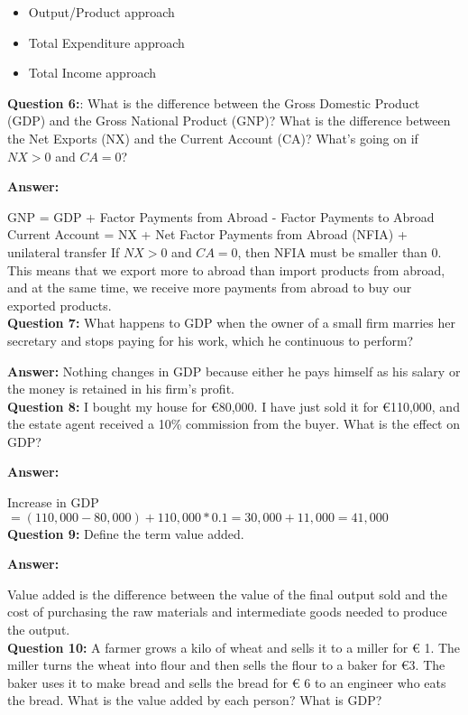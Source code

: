 \documentclass[a4paper, 11pt]{article}
\begin{document}
\begin{itemize}
\item Output/Product approach
\item Total Expenditure approach
\item Total Income approach
\end{itemize}  

\textbf{Question 6:}: What is the difference between the Gross Domestic Product (GDP) and the Gross National Product (GNP)? What is the difference between the Net Exports (NX) and the Current Account (CA)? What’s going on if $NX>0$ and $CA=0$?

\textbf{Answer:} 

GNP = GDP + Factor Payments from Abroad - Factor Payments to Abroad
Current Account = NX + Net Factor Payments from Abroad (NFIA) + unilateral transfer
If $NX>0$ and $CA=0$, then NFIA must be smaller than 0. This means that we export more to abroad than import products from abroad, and at the same time, we receive more payments from abroad to buy our exported products. \\

\textbf{Question 7:} What happens to GDP when the owner of a small firm marries her secretary and stops paying for his work, which he continuous to perform?

\textbf{Answer:} 
Nothing changes in GDP because either he pays himself as his salary or the money is retained in his firm's profit. \\

\textbf{Question 8:} I bought my house for €80,000. I have just sold it for €110,000, and the estate agent received a 10\% commission from the buyer. What is the effect on GDP?

\textbf{Answer:} 

Increase in GDP $= (110,000-80,000) + 110,000*0.1 = 30,000 + 11,000 = 41,000$ \\

\textbf{Question 9:} Define the term value added.

\textbf{Answer:} 

Value added is the difference between the value of the final output sold and the cost of purchasing the raw materials and intermediate goods needed to produce the output. \\

\textbf{Question 10:} A farmer grows a kilo of wheat and sells it to a miller for € 1. The miller turns the wheat into flour and then sells the flour to a baker for €3. The baker uses it to make bread and sells the bread for € 6 to an engineer who eats the bread. What is the value added by each person? What is GDP?
\end{document}
